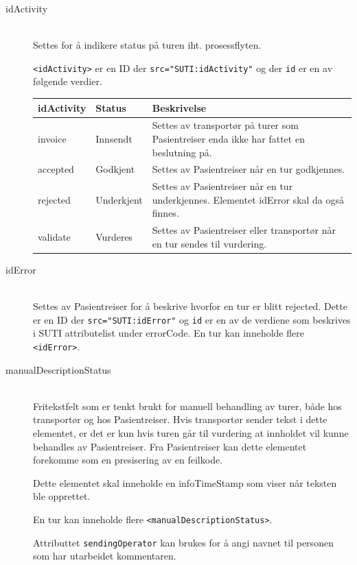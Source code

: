 \documentclass[a4paper,titlepage,norsk,11pt]{article}
\begin{document}
\begin{description}

	\item[idActivity] \hfill \\
	Settes for å indikere status på turen iht. prosessflyten.

	\lstinline{<idActivity>} er en ID der \lstinline{src="SUTI:idActivity"} og der \lstinline{id} er en av følgende verdier.

	\begin{tabularx}{0.9\textwidth}{|l|l|X|}
	\hline
	\textbf{idActivity} & \textbf{Status} & \textbf{Beskrivelse} \\\hline
	invoice & Innsendt & Settes av transportør på turer som Pasientreiser enda ikke har fattet en beslutning på. \\\hline
	accepted & Godkjent & Settes av Pasientreiser når en tur godkjennes. \\\hline
	rejected & Underkjent & Settes av Pasientreiser når en tur underkjennes. Elementet idError skal da også finnes. \\\hline
  validate & Vurderes & Settes av Pasientreiser eller transportør når en tur sendes til vurdering. \\\hline
	\end{tabularx}

	\item[idError] \hfill \\
	Settes av Pasientreiser for å beskrive hvorfor en tur er blitt rejected. Dette er en ID der \lstinline{src="SUTI:idError"} og \lstinline{id} er en av de verdiene som beskrives i SUTI attributelist under errorCode.
	En tur kan inneholde flere \lstinline{<idError>}.

	\item[manualDescriptionStatus] \hfill \\
	Fritekstfelt som er tenkt brukt for manuell behandling av turer, både hos transportør og hos Pasientreiser. 	Hvis transportør sender tekst i dette elementet, er det er kun hvis turen går til vurdering at innholdet vil kunne behandles av Pasientreiser. Fra Pasientreiser kan dette elementet forekomme som en presisering av en feilkode.

	Dette elementet skal inneholde en infoTimeStamp som viser når teksten ble opprettet.

	En tur kan inneholde flere \lstinline{<manualDescriptionStatus>}.

  Attributtet \lstinline{sendingOperator} kan brukes for å angi navnet til personen som har utarbeidet kommentaren.


\end{description}
\end{document}
